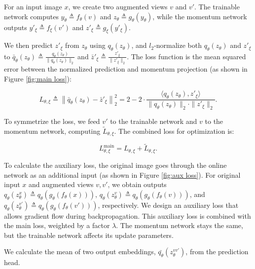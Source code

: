For an input image $x$, we create two augmented views $v$ and ${v}'$. The trainable network computes $y_{\theta} \triangleq f_{\theta}(v)$ and $z_{\theta} \triangleq g_{\theta}(y_{\theta})$, while the momentum network outputs $y'_{\xi} \triangleq f_{\xi}(v')$ and $z'_{\xi} \triangleq g_{\xi}(y'_{\xi})$.

We then predict $z'_{\xi}$ from $z_{\theta}$ using $q_{\theta}(z_{\theta})$, and $l_2$-normalize both $q_{\theta}(z_{\theta})$ and $z'_{\xi}$ to $\bar{q}_{\theta}(z_{\theta}) \triangleq \frac{q_{\theta}(z_{\theta})}{\| q_{\theta}(z_{\theta}) \|_{2}}$ and $\bar{z}'_{\xi} \triangleq \frac{z'_{\xi}}{\| z'_{\xi} \|_{2}}$. The loss function is the mean squared error between the normalized prediction and momentum projection (as shown in Figure \ref{fig:main loss}):

\begin{equation} \label{eq:loss}
L_{\theta, \xi} \triangleq \left\| \bar{q}_{\theta}(z_{\theta}) - \bar{z}'_{\xi} \right\|_{2}^{2} = 2 - 2 \cdot \frac{\langle q_{\theta}(z_{\theta}), z'_{\xi} \rangle}{\| q_{\theta}(z_{\theta}) \|_{2} \cdot \| z'_{\xi} \|_{2}}.
\end{equation}

To symmetrize the loss, we feed $v'$ to the trainable network and $v$ to the momentum network, computing $\tilde{L}_{\theta, \xi}$. The combined loss for optimization is:

\begin{equation}
L_{\theta, \xi}^{\text{main}} = L_{\theta, \xi} + \tilde{L}_{\theta, \xi}.
\end{equation}

To calculate the auxiliary loss, the original image goes through the online network as an additional input (as shown in Figure \ref{fig:aux loss}). For original input $x$ and augmented views $v, v'$, we obtain outputs $q_{\theta}(z_{\theta }^{x})\triangleq q_{\theta}(g_{\theta}(f_{\theta}(x)))$, $q_{\theta}(z_{\theta }^{v})\triangleq q_{\theta}(g_{\theta}(f_{\theta}(v)))$, and $q_{\theta}(z_{\theta }^{v'})\triangleq q_{\theta}(g_{\theta}(f_{\theta}(v')))$, respectively. We design an auxiliary loss that allows gradient flow during backpropagation. This auxiliary loss is combined with the main loss, weighted by a factor \(\lambda\). The momentum network stays the same, but the trainable network affects its update parameters.

We calculate the mean of two output embeddings, $\bar{q_{\theta}}(z_{\theta }^{vv'})$, from the prediction head.

